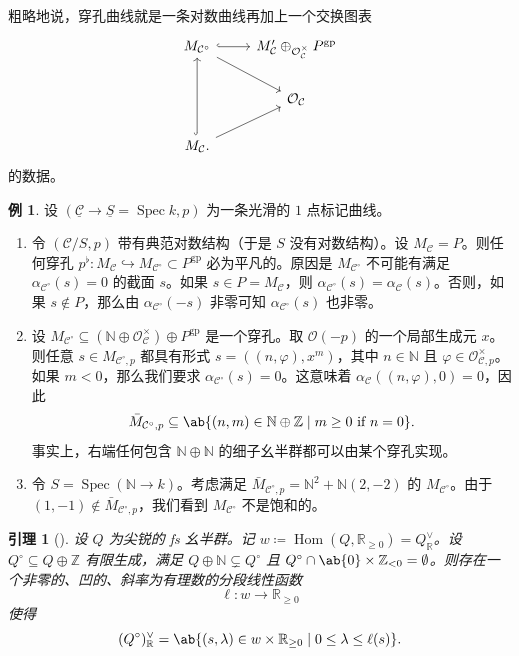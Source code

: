 \documentclass{amsart}
\newtheorem{lem}[thm]{引理}
\theoremstyle{definition}
\newtheorem{exm}[thm]{例}
\theoremstyle{remark}
\theoremstyle{plain}
\theoremstyle{definition}
\theoremstyle{remark}
\newcommand{\N}{\mathbb{N}}
\newcommand{\R}{\mathbb{R}}
\newcommand{\Z}{\mathbb{Z}}
\newcommand{\mc}[1]{\mathcal{#1}}
\newcommand{\on}[1]{\operatorname{#1}}
\newcommand{\ul}[1]{\underline{#1}}
\newcommand{\1}{\mathbf{1}}
\newcommand{\2}{\mathbf{2}}
\newcommand{\3}{\mathbf{3}}
\DeclareMathOperator{\Hom}{Hom}
\DeclareMathOperator{\Spec}{Spec}
\begin{document}
粗略地说，穿孔曲线就是一条对数曲线再加上一个交换图表
\begin{equation*}
\begin{tikzcd}
    M_{\mc{C}^{\circ}} \ar{dr} \ar[hookrightarrow]{r} & M_{\mc{C}}' \oplus_{\mc{O}_{\mc{C}}^{\times}} P^{\on{gp}} \\
    & \mc{O}_{\mc{C}} \\
    M_{\mc{C}} \ar[hookrightarrow]{uu} \ar{ur}.
\end{tikzcd}
\end{equation*}
的数据。


\begin{exm}
    设 \((\ul{\mc{C}} \to \ul{S} = \Spec k, p)\) 为一条光滑的 \(1\) 点标记曲线。
    \begin{enumerate}
        \item 令 \((\mc{C}/S, p)\) 带有典范对数结构（于是 \(S\) 没有对数结构）。设 \(M_{\mc{C}} = P\)。则任何穿孔 \(p^{\flat} \colon M_{\mc{C}} \hookrightarrow M_{\mc{C}^{\circ}} \subset P^{\on{gp}}\) 必为平凡的。原因是 \(M_{\mc{C}^{\circ}}\) 不可能有满足 \(\alpha_{\mc{C}^{\circ}}(s) = 0\) 的截面 \(s\)。如果 \(s \in P = M_{\mc{C}}\)，则 \(\alpha_{\mc{C}^{\circ}}(s) = \alpha_{\mc{C}}(s)\)。否则，如果 \(s \notin P\)，那么由 \(\alpha_{\mc{C}^{\circ}}(-s)\) 非零可知 \(\alpha_{\mc{C}^{\circ}}(s)\) 也非零。
        \item 设 \(M_{\mc{C}^{\circ}} \subseteq (\N \oplus \mc{O}_{\mc{C}}^{\times}) \oplus P^{\on{gp}}\) 是一个穿孔。取 \(\mc{O}(-p)\) 的一个局部生成元 \(x\)。则任意 \(s \in M_{\mc{C}^{\circ}, p}\) 都具有形式 \(s = ((n, \varphi), x^m)\)，其中 \(n \in \N\) 且 \(\varphi \in \mc{O}_{\mc{C}, p}^{\times}\)。如果 \(m < 0\)，那么我们要求 \(\alpha_{\mc{C}^{\circ}}(s) = 0\)。这意味着 \(\alpha_{\mc{C}}((n, \varphi), 0) = 0\)，因此
            \[ \bar{M}_{\mc{C}^{\circ}, p} \subseteq \ab\{(n, m) \in \N \oplus \Z \mid m \geq 0 \text{ if } n = 0 \}. \]
            事实上，右端任何包含 \(\N \oplus \N\) 的细子幺半群都可以由某个穿孔实现。
        \item 令 \(S = \Spec(\N \to k)\)。考虑满足 \(\bar{M}_{\mc{C}^{\circ}, p} = \N^2 + \N (2,-2)\) 的 \(M_{\mc{C}^{\circ}}\)。由于 \((1,-1) \notin \bar{M}_{\mc{C}^{\circ}, p}\)，我们看到 \(M_{\mc{C}^{\circ}}\) 不是饱和的。
    \end{enumerate}
\end{exm}

\begin{lem}[{\cite{ACGS2025}}]
    设 \(Q\) 为尖锐的 fs 幺半群。记 \(w \coloneqq \Hom(Q, \R_{\geq 0}) = Q_{\R}^{\vee}\)。设 \(Q^{\circ} \subseteq Q \oplus \Z\) 有限生成，满足 \(Q \oplus \N \subsetneq Q^{\circ}\) 且 \(Q^{\circ} \cap \ab\{0\} \times \Z_{<0} = \emptyset\)。则存在一个非零的、凹的、斜率为有理数的分段线性函数
    \[ \ell \colon w \to \R_{\geq 0} \]
    使得
    \[ (Q^{\circ})_{\R}^{\vee} = \ab\{ (s, \lambda) \in w \times \R_{\geq 0} \mid 0 \leq \lambda \leq \ell(s) \}. \]
\end{lem}
\end{document}

